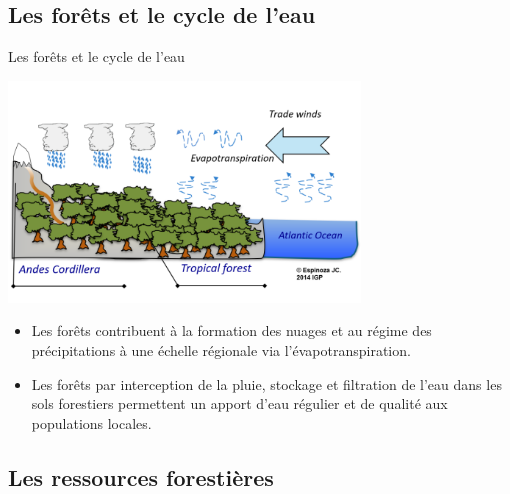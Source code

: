\documentclass[10pt,table,dvipsnames,compress]{beamer}
\begin{document}
\subsection{Les forêts et le cycle de l'eau}
\label{sec:org35ba3a5}

\begin{frame}[label={sec:orgbf312dd}]{Les forêts et le cycle de l'eau}
\begin{center}
\includegraphics[width=0.7\textwidth]{figs/evapotranspiration-amazonie.png}
\end{center}

\begin{itemize}
\item Les forêts contribuent à la formation des nuages et au régime des précipitations à une échelle régionale via l'évapotranspiration.
\item Les forêts par interception de la pluie, stockage et filtration de l'eau dans les sols forestiers permettent un apport d'eau régulier et de qualité aux populations locales.
\end{itemize}
\end{frame}
\subsection{Les ressources forestières}
\label{sec:org1771b0c}
\end{document}

